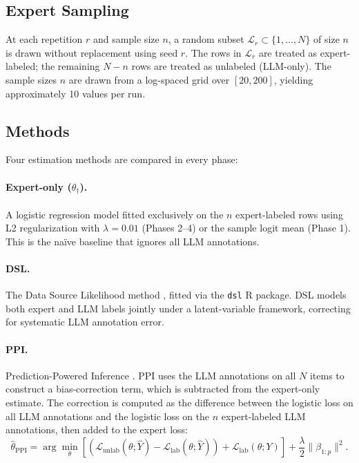 \subsection{Expert Sampling}

At each repetition $r$ and sample size $n$, a random subset $\mathcal{L}_r \subset \{1, \ldots, N\}$ of size $n$ is drawn without replacement using seed $r$. The rows in $\mathcal{L}_r$ are treated as expert-labeled; the remaining $N - n$ rows are treated as unlabeled (LLM-only). The sample sizes $n$ are drawn from a log-spaced grid over $[20, 200]$, yielding approximately 10 values per run.

\subsection{Methods}

Four estimation methods are compared in every phase:

\paragraph{Expert-only ($\theta_\dagger$).}
A logistic regression model fitted exclusively on the $n$ expert-labeled rows using L2 regularization with $\lambda = 0.01$ (Phases 2--4) or the sample logit mean (Phase 1). This is the na\"{i}ve baseline that ignores all LLM annotations.

\paragraph{DSL.}
The Data Source Likelihood method \citep[see][]{dsl_paper}, fitted via the \texttt{dsl} R package. DSL models both expert and LLM labels jointly under a latent-variable framework, correcting for systematic LLM annotation error.

\paragraph{PPI.}
Prediction-Powered Inference \citep{angelopoulos2023prediction}. PPI uses the LLM annotations on all $N$ items to construct a bias-correction term, which is subtracted from the expert-only estimate. The correction is computed as the difference between the logistic loss on all LLM annotations and the logistic loss on the $n$ expert-labeled LLM annotations, then added to the expert loss:
\[
    \hat{\theta}_{\text{PPI}} = \arg\min_\theta \left[ (\mathcal{L}_{\text{unlab}}(\theta;\hat{Y}) - \mathcal{L}_{\text{lab}}(\theta;\hat{Y})) + \mathcal{L}_{\text{lab}}(\theta;Y) \right] + \frac{\lambda}{2}\|\beta_{1:p}\|^2.
\]

